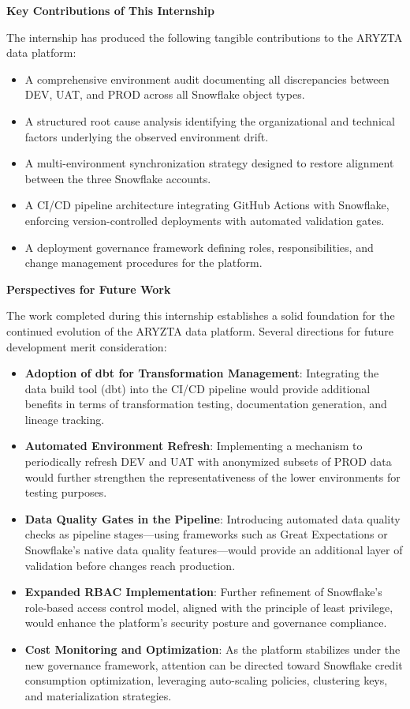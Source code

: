 \vspace{0.4cm}
\noindent\textbf{Key Contributions of This Internship}

The internship has produced the following tangible contributions to the ARYZTA data platform:

\begin{itemize}
  \item A comprehensive environment audit documenting all discrepancies between DEV, UAT, and PROD across all Snowflake object types.
  \item A structured root cause analysis identifying the organizational and technical factors underlying the observed environment drift.
  \item A multi-environment synchronization strategy designed to restore alignment between the three Snowflake accounts.
  \item A CI/CD pipeline architecture integrating GitHub Actions with Snowflake, enforcing version-controlled deployments with automated validation gates.
  \item A deployment governance framework defining roles, responsibilities, and change management procedures for the platform.
\end{itemize}

\vspace{0.4cm}
\noindent\textbf{Perspectives for Future Work}

The work completed during this internship establishes a solid foundation for the continued evolution of the ARYZTA data platform. Several directions for future development merit consideration:

\begin{itemize}
  \item \textbf{Adoption of dbt for Transformation Management}: Integrating the data build tool (\gls{dbt}) into the CI/CD pipeline would provide additional benefits in terms of transformation testing, documentation generation, and lineage tracking.
  \item \textbf{Automated Environment Refresh}: Implementing a mechanism to periodically refresh DEV and UAT with anonymized subsets of PROD data would further strengthen the representativeness of the lower environments for testing purposes.
  \item \textbf{Data Quality Gates in the Pipeline}: Introducing automated data quality checks as pipeline stages---using frameworks such as Great Expectations or Snowflake's native data quality features---would provide an additional layer of validation before changes reach production.
  \item \textbf{Expanded RBAC Implementation}: Further refinement of Snowflake's role-based access control model, aligned with the principle of least privilege, would enhance the platform's security posture and governance compliance.
  \item \textbf{Cost Monitoring and Optimization}: As the platform stabilizes under the new governance framework, attention can be directed toward Snowflake credit consumption optimization, leveraging auto-scaling policies, clustering keys, and materialization strategies.
\end{itemize}

